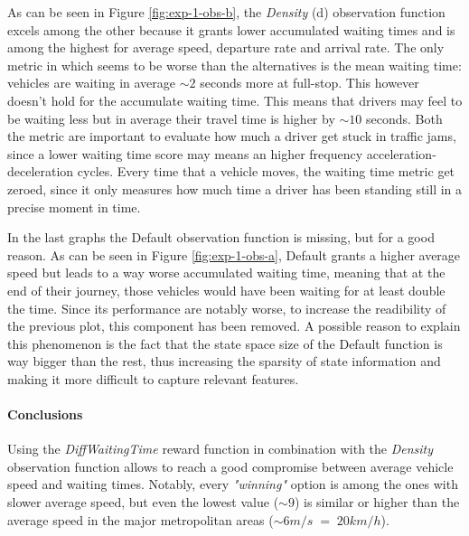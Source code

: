 As can be seen in Figure \ref{fig:exp-1-obs-b}, the \textit{Density} (d) observation function excels among the other because it grants lower accumulated waiting times and is among the highest for average speed, departure rate and arrival rate.
The only metric in which seems to be worse than the alternatives is the mean waiting time: vehicles are waiting in average $\sim2$ seconds more at full-stop.
This however doesn't hold for the accumulate waiting time.
This means that drivers may feel to be waiting less but in average their travel time is higher by $\sim10$ seconds.
Both the metric are important to evaluate how much a driver get stuck in traffic jams, since a lower waiting time score may means an higher frequency acceleration-deceleration cycles.
Every time that a vehicle moves, the waiting time metric get zeroed, since it only measures how much time a driver has been standing still in a precise moment in time.

In the last graphs the Default observation function is missing, but for a good reason.
As can be seen in Figure \ref{fig:exp-1-obs-a}, Default grants a higher average speed but leads to a way worse accumulated waiting time, meaning that at the end of their journey, those vehicles would have been waiting for at least double the time.
Since its performance are notably worse, to increase the readibility of the previous plot, this component has been removed.
A possible reason to explain this phenomenon is the fact that the state space size of the Default function is way bigger than the rest, thus increasing the sparsity of state information and making it more difficult to capture relevant features.



\paragraph{Conclusions}

Using the \textit{DiffWaitingTime} reward function in combination with the \textit{Density} observation function allows to reach a good compromise between average vehicle speed and waiting times.
Notably, every \textit{"winning"} option is among the ones with slower average speed, but even the lowest value ($\sim9$) is similar or higher than the average speed in the major metropolitan areas ($\sim 6 m/s \; = \; 20 km/h$).

